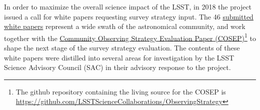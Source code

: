 In order to maximize the overall science impact of the LSST, in 2018 the project issued a call for white papers \citep{Document-28382} requesting survey strategy input. The 46 \href{https://www.lsst.org/submitted-whitepaper-2018}{submitted white papers} represent a wide swath of the astronomical community, and work together with the \href{https://github.com/LSSTScienceCollaborations/ObservingStrategy/raw/master/whitepaper/releases/LSST_Observing_Strategy_White_Paper_v1.0.pdf}{Community Observing Strategy Evaluation Paper (COSEP)}\footnote{The github repository containing the living source for the COSEP is \href{https://github.com/LSSTScienceCollaborations/ObservingStrategy}{https://github.com/LSSTScienceCollaborations/ObservingStrategy}} to shape the next stage of the survey strategy evaluation. The contents of these white papers were distilled into several areas for investigation by the LSST Science Advisory Council (SAC) in their advisory response \citep{Document-32816} to the project.

